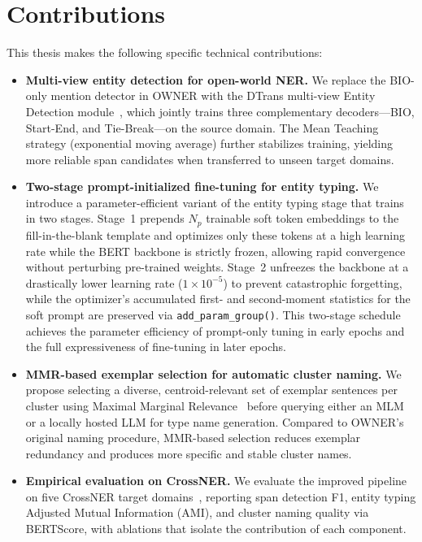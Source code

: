 \documentclass[14pt]{extreport}
\begin{document}
\section{Contributions} \label{sec:Overview}

This thesis makes the following specific technical contributions:

\begin{itemize}
    \item \textbf{Multi-view entity detection for open-world NER.} We replace the BIO-only mention detector in OWNER with the DTrans multi-view Entity Detection module~\cite{zhang-etal-2024-dtrans}, which jointly trains three complementary decoders---BIO, Start-End, and Tie-Break---on the source domain. The Mean Teaching strategy (exponential moving average) further stabilizes training, yielding more reliable span candidates when transferred to unseen target domains.

    \item \textbf{Two-stage prompt-initialized fine-tuning for entity typing.} We introduce a parameter-efficient variant of the entity typing stage that trains in two stages. Stage~1 prepends $N_p$ trainable soft token embeddings to the fill-in-the-blank template and optimizes only these tokens at a high learning rate while the BERT backbone is strictly frozen, allowing rapid convergence without perturbing pre-trained weights. Stage~2 unfreezes the backbone at a drastically lower learning rate ($1\times10^{-5}$) to prevent catastrophic forgetting, while the optimizer's accumulated first- and second-moment statistics for the soft prompt are preserved via \texttt{add\_param\_group()}. This two-stage schedule achieves the parameter efficiency of prompt-only tuning in early epochs and the full expressiveness of fine-tuning in later epochs.

    \item \textbf{MMR-based exemplar selection for automatic cluster naming.} We propose selecting a diverse, centroid-relevant set of exemplar sentences per cluster using Maximal Marginal Relevance~\cite{carbonell-goldstein-1998-use} before querying either an MLM or a locally hosted LLM for type name generation. Compared to OWNER's original naming procedure, MMR-based selection reduces exemplar redundancy and produces more specific and stable cluster names.

    \item \textbf{Empirical evaluation on CrossNER.} We evaluate the improved pipeline on five CrossNER target domains~\cite{liu-etal-2021-crossner}, reporting span detection F1, entity typing Adjusted Mutual Information (AMI), and cluster naming quality via BERTScore, with ablations that isolate the contribution of each component.
\end{itemize}
\end{document}
